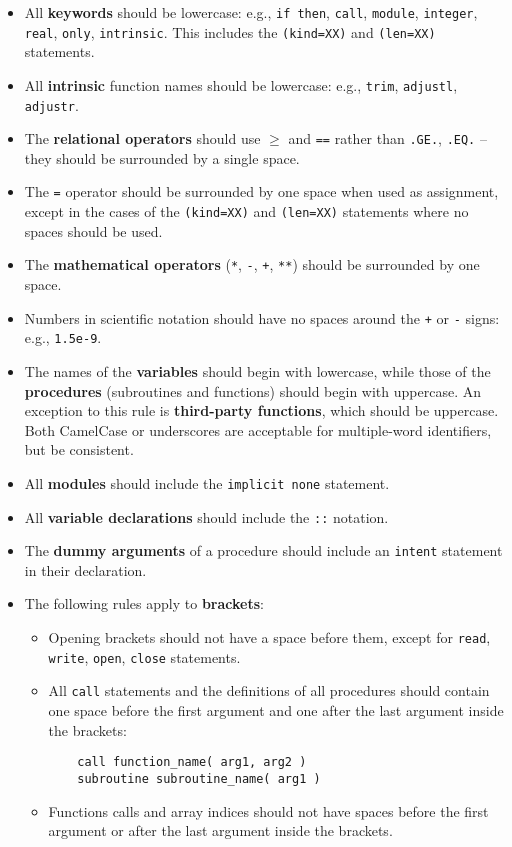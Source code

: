 \begin{itemize}
\item All \textbf{keywords} should be lowercase: e.g., \texttt{if\ then},
  \texttt{call}, \texttt{module}, \texttt{integer}, \texttt{real},
  \texttt{only}, \texttt{intrinsic}. This includes the
  \texttt{(kind=XX)} and \texttt{(len=XX)} statements.
\item All \textbf{intrinsic} function names should be lowercase: e.g.,
  \texttt{trim}, \texttt{adjustl}, \texttt{adjustr}.
\item The \textbf{relational operators} should use \texttt{$\geq$} and
  \texttt{==} rather than \texttt{.GE.}, \texttt{.EQ.} -- they should
  be surrounded by a single space.
\item The \texttt{=} operator should be surrounded by one space when
  used as assignment, except in the cases of the \texttt{(kind=XX)}
  and \texttt{(len=XX)} statements where no spaces should be used.
\item The \textbf{mathematical operators} (\texttt{*}, \texttt{-},
  \texttt{+}, \texttt{**}) should be surrounded by one space.
\item Numbers in scientific notation should have no spaces around the
  \texttt{+} or \texttt{-} signs: e.g., \texttt{1.5e-9}.
\item The names of the \textbf{variables} should begin with lowercase,
  while those of the \textbf{procedures} (subroutines and functions)
  should begin with uppercase. An exception to this rule is
  \textbf{third-party functions}, which should be uppercase. Both
  CamelCase or underscores are acceptable for multiple-word
  identifiers, but be consistent.
\item All \textbf{modules} should include the \texttt{implicit none}
  statement.
\item All \textbf{variable declarations} should include the
  \texttt{::} notation.
\item The \textbf{dummy arguments} of a procedure should include an
  \texttt{intent} statement in their declaration.
\item The following rules apply to \textbf{brackets}:
  \begin{itemize}
  \item Opening brackets should not have a space before them, except
    for \texttt{read}, \texttt{write}, \texttt{open}, \texttt{close}
    statements.
  \item All \texttt{call} statements and the definitions of all
    procedures should contain one space before the first argument and
    one after the last argument inside the brackets:
    \begin{verbatim}
    call function_name( arg1, arg2 )
    subroutine subroutine_name( arg1 )
    \end{verbatim}
  \item Functions calls and array indices should not have spaces
    before the first argument or after the last argument inside the
    brackets.
  \end{itemize}
\end{itemize}
